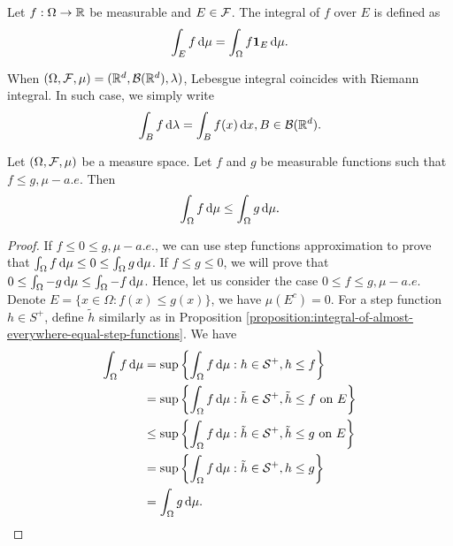\begin{definition}
 Let $f:\Omega\to\mathbb{R}$ be measurable and $E \in \mathcal{F}$. The integral of $f$ over $E$ is defined as
 \begin{equation}
  \int_E f\,\mathrm{d} \mu = \int_\Omega f\mathbf{1}_E\,\mathrm{d} \mu.
 \end{equation}
\end{definition}

\begin{remark}
 When $(\Omega, \mathcal{F}, \mu) = (\mathbb{R}^d, \mathcal{B}{(\mathbb{R}^d)}, \lambda)$, Lebesgue integral coincides with Riemann integral. In such case, we simply write
 \begin{equation}
  \int_B f\,\mathrm{d}\lambda = \int_B f(x)\,\mathrm{d} x, B\in\mathcal{B}(\mathbb{R}^d).
 \end{equation}
\end{remark}

\begin{proposition}
 \label{proposition:integral-of-le-everywhere-functions}
 Let $(\Omega,\mathcal{F},\mu)$ be a measure space. Let $f$ and $g$ be measurable functions such that $f\le g, \mu-a.e.$ Then
 \begin{equation}
  \int_\Omega f\,\mathrm{d} \mu \le  \int_\Omega g\,\mathrm{d} \mu.
 \end{equation}
\end{proposition}

\begin{proof}
 If $f\le 0  \le g, \mu-a.e.$, we can use step functions approximation to prove that $\int_\Omega f\,\mathrm{d} \mu \le 0 \le  \int_\Omega g\,\mathrm{d} \mu$. If $f\le g\le 0$, we will prove that $0\le \int_\Omega -g\,\mathrm{d} \mu \le \int_\Omega -f\,\mathrm{d} \mu$. Hence, let us consider the case $ 0  \le f\le  g, \mu-a.e.$ Denote $E = \{x\in \Omega : f(x) \le g(x)\}$, we have $\mu(E^c) = 0$. For a step function $h\in S^+$, define $\tilde{h}$ similarly as in Proposition  \ref{proposition:integral-of-almost-everywhere-equal-step-functions}. We have
 \begin{align*}
  \int_\Omega f\,\mathrm{d} \mu
   & = \sup\left\{\int_\Omega f\,\mathrm{d} \mu : h\in \mathcal{S}^+, h\le f\right\}                                  \\
   & = \sup\left\{\int_\Omega f\,\mathrm{d} \mu : \tilde{h}\in \mathcal{S}^+, \tilde{h}\le f \text{ on } E\right\}    \\
   & \le  \sup\left\{\int_\Omega f\,\mathrm{d} \mu : \tilde{h}\in \mathcal{S}^+, \tilde{h}\le g \text{ on } E\right\} \\
   & =  \sup\left\{\int_\Omega f\,\mathrm{d} \mu : \tilde{h}\in \mathcal{S}^+, h\le g\right\}                         \\
   & =  \int_\Omega g\,\mathrm{d} \mu.
 \end{align*}
\end{proof}

